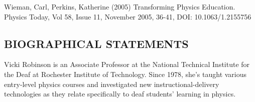 \documentclass[11.5pt]{sig-alternate} %
\begin{document}
Wieman, Carl, Perkins, Katherine (2005) Transforming Physics Education. Physics Today, Vol 58, Issue 11, November 2005, 36-41, DOI: 10.1063/1.2155756 

\clearpage

\leftskip 0in
\parindent 0in 
\begin{large}
\section*{BIOGRAPHICAL STATEMENTS}
Vicki Robinson is an Associate Professor at the National Technical Institute for the Deaf at Rochester Institute of Technology. Since 1978, she’s taught various entry-level physics courses and investigated new instructional-delivery technologies as they relate specifically to deaf students’ learning in physics.

\end{large}
\end{document}

